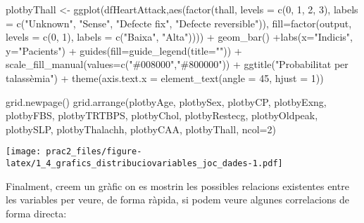 \documentclass[
]{article}
\newenvironment{Shaded}{\begin{snugshade}}{\end{snugshade}}
\newcommand{\AttributeTok}[1]{\textcolor[rgb]{0.80,0.80,0.80}{#1}}
\newcommand{\DecValTok}[1]{\textcolor[rgb]{0.86,0.86,0.80}{#1}}
\newcommand{\FunctionTok}[1]{\textcolor[rgb]{0.94,0.94,0.56}{#1}}
\newcommand{\NormalTok}[1]{\textcolor[rgb]{0.80,0.80,0.80}{#1}}
\newcommand{\OtherTok}[1]{\textcolor[rgb]{0.94,0.94,0.56}{#1}}
\newcommand{\SpecialCharTok}[1]{\textcolor[rgb]{0.86,0.64,0.64}{#1}}
\newcommand{\StringTok}[1]{\textcolor[rgb]{0.80,0.58,0.58}{#1}}
\begin{document}
\begin{Shaded}
\begin{Highlighting}[]
\NormalTok{plotbyThall }\OtherTok{\textless{}{-}} \FunctionTok{ggplot}\NormalTok{(dfHeartAttack,}\FunctionTok{aes}\NormalTok{(}\FunctionTok{factor}\NormalTok{(thall, }\AttributeTok{levels =} \FunctionTok{c}\NormalTok{(}\DecValTok{0}\NormalTok{, }\DecValTok{1}\NormalTok{, }\DecValTok{2}\NormalTok{, }\DecValTok{3}\NormalTok{), }\AttributeTok{labels =} \FunctionTok{c}\NormalTok{(}\StringTok{"Unknown"}\NormalTok{, }\StringTok{"Sense"}\NormalTok{, }\StringTok{"Defecte fix"}\NormalTok{, }\StringTok{"Defecte reversible"}\NormalTok{)), }\AttributeTok{fill=}\FunctionTok{factor}\NormalTok{(output, }\AttributeTok{levels =} \FunctionTok{c}\NormalTok{(}\DecValTok{0}\NormalTok{, }\DecValTok{1}\NormalTok{), }\AttributeTok{labels =} \FunctionTok{c}\NormalTok{(}\StringTok{"Baixa"}\NormalTok{, }\StringTok{"Alta"}\NormalTok{)))) }\SpecialCharTok{+} 
                    \FunctionTok{geom\_bar}\NormalTok{() }\SpecialCharTok{+}\FunctionTok{labs}\NormalTok{(}\AttributeTok{x=}\StringTok{"Indicis"}\NormalTok{, }\AttributeTok{y=}\StringTok{"Pacients"}\NormalTok{) }\SpecialCharTok{+} 
                    \FunctionTok{guides}\NormalTok{(}\AttributeTok{fill=}\FunctionTok{guide\_legend}\NormalTok{(}\AttributeTok{title=}\StringTok{""}\NormalTok{)) }\SpecialCharTok{+} 
                  \FunctionTok{scale\_fill\_manual}\NormalTok{(}\AttributeTok{values=}\FunctionTok{c}\NormalTok{(}\StringTok{"\#008000"}\NormalTok{,}\StringTok{"\#800000"}\NormalTok{)) }\SpecialCharTok{+} 
                    \FunctionTok{ggtitle}\NormalTok{(}\StringTok{"Probabilitat per talassèmia"}\NormalTok{) }\SpecialCharTok{+}
          \FunctionTok{theme}\NormalTok{(}\AttributeTok{axis.text.x =} \FunctionTok{element\_text}\NormalTok{(}\AttributeTok{angle =} \DecValTok{45}\NormalTok{, }\AttributeTok{hjust =} \DecValTok{1}\NormalTok{))}

\FunctionTok{grid.newpage}\NormalTok{()}
\FunctionTok{grid.arrange}\NormalTok{(plotbyAge, plotbySex, plotbyCP, plotbyExng, plotbyFBS, plotbyTRTBPS, plotbyChol, plotbyRestecg, plotbyOldpeak, plotbySLP, plotbyThalachh, plotbyCAA, plotbyThall, }\AttributeTok{ncol=}\DecValTok{2}\NormalTok{)}
\end{Highlighting}
\end{Shaded}

\texttt{[image: prac2\_files/figure-latex/1\_4\_grafics\_distribuciovariables\_joc\_dades-1.pdf]}

Finalment, creem un gràfic on es mostrin les possibles relacions
existentes entre les variables per veure, de forma ràpida, si podem
veure algunes correlacions de forma directa:
\end{document}
